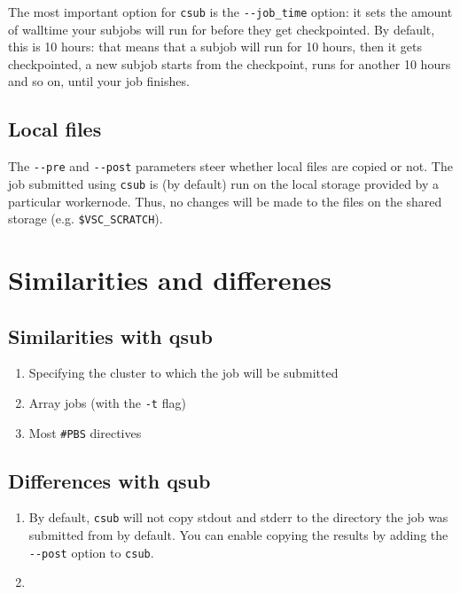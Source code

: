 The most important option for \lstinline|csub| is the \lstinline|--job_time| option: it sets the amount
of walltime your subjobs will run for before they get checkpointed. By default, this
is 10 hours: that means that a subjob will run for 10 hours, then it gets checkpointed,
a new subjob starts from the checkpoint, runs for another 10 hours and so on, until
your job finishes.

\subsection{Local files}

The \lstinline|--pre| and \lstinline|--post| parameters steer whether local files are copied or not.
The job submitted using \lstinline|csub| is (by default) run on the local storage provided
by a particular workernode. Thus, no changes will be made to the files on the
shared storage (e.g. \texttt{\$VSC_SCRATCH}).

\section{Similarities and differenes}

\subsection{Similarities with qsub}

\begin{enumerate}
    \item Specifying the cluster to which the job will be submitted
    \item Array jobs (with the \lstinline|-t| flag)
    \item Most \lstinline|#PBS| directives
\end{enumerate}


\subsection{Differences with qsub}

\begin{enumerate}
    \item By default, \lstinline|csub| will not copy stdout and stderr to the directory
        the job was submitted from by default. You can enable copying the results
        by adding the \lstinline|--post| option to \lstinline|csub|.
    \item
\end{enumerate}
